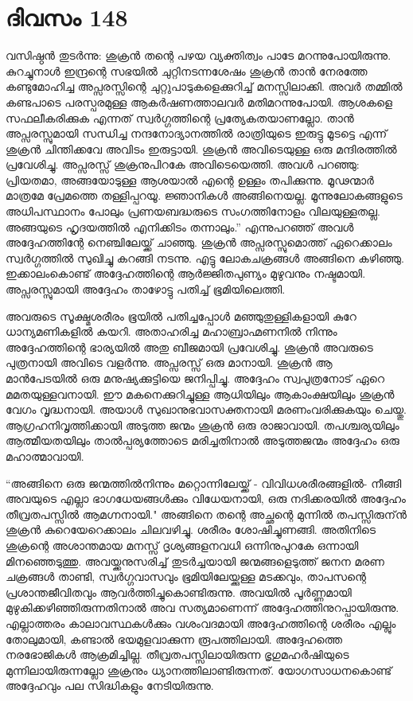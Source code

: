 \section{ദിവസം 148}


വസിഷ്ഠൻ തുടർന്നു: ശുക്രൻ തന്റെ പഴയ വ്യക്തിത്വം പാടേ മറന്നുപോയിരുന്നു. കുറച്ചുനാൾ ഇന്ദ്രന്റെ സഭയിൽ ചുറ്റിനടന്നശേഷം ശുക്രൻ താൻ നേരത്തേ കണ്ടുമോഹിച്ച അപ്സരസ്സിന്റെ ചുറ്റുപാടുകളെക്കുറിച്ച് മനസ്സിലാക്കി. അവർ തമ്മിൽ കണ്ടപാടെ പരസ്പരമുള്ള ആകർഷണത്താലവർ മതിമറന്നുപോയി. ആശകളെ സഫലീകരിക്കുക എന്നത് സ്വർഗ്ഗത്തിന്റെ പ്രത്യേകതയാണല്ലോ. താൻ അപ്സരസ്സുമായി സന്ധിച്ച നന്ദനോദ്യാനത്തില്‍  രാത്രിയുടെ ഇരുട്ടു മൂടട്ടെ  എന്ന് ശുക്രൻ ചിന്തിക്കവേ അവിടം ഇരുട്ടായി. ശുക്രൻ അവിടെയുള്ള ഒരു മന്ദിരത്തിൽ പ്രവേശിച്ചു. അപ്സരസ്സ് ശുക്രനുപിറകേ അവിടെയെത്തി. അവൾ പറഞ്ഞു: പ്രിയതമാ, അങ്ങയോടുള്ള ആശയാൽ എന്റെ ഉള്ളം തപിക്കുന്നു. മൂഢന്മാർ മാത്രമേ പ്രേമത്തെ തള്ളിപ്പറയൂ. ജ്ഞാനികൾ അങ്ങിനെയല്ല. മൂന്നുലോകങ്ങളുടെ അധിപസ്ഥാനം പോലും പ്രണയബദ്ധരുടെ സംഗത്തിനോളം വിലയുള്ളതല്ല. അങ്ങയുടെ ഹൃദയത്തിൽ എനിക്കിടം തന്നാലും.” എന്നുപറഞ്ഞ് അവൾ അദ്ദേഹത്തിന്റേ നെഞ്ചിലേയ്ക്ക് ചാഞ്ഞു. ശുക്രൻ അപ്സരസ്സുമൊത്ത് ഏറെക്കാലം സ്വർഗ്ഗത്തിൽ സുഖിച്ചു കറങ്ങി നടന്നു. എട്ടു ലോകചക്രങ്ങൾ അങ്ങിനെ കഴിഞ്ഞു. ഇക്കാലംകൊണ്ട് അദ്ദേഹത്തിന്റെ ആർജ്ജിതപുണ്യം മുഴുവനും നഷ്ടമായി. അപ്സരസ്സുമായി അദ്ദേഹം താഴോട്ടു പതിച്ച് ഭൂമിയിലെത്തി.

അവരുടെ സൂക്ഷ്മശരീരം ഭൂയിൽ പതിച്ചപ്പോൾ മഞ്ഞുതുള്ളികളായി കുറേ ധാന്യമണികളിൽ കയറി. അതാഹരിച്ച മഹാബ്രാഹ്മണനിൽ നിന്നും അദ്ദേഹത്തിന്റെ ഭാര്യയിൽ അതു ബീജമായി പ്രവേശിച്ചു. ശുക്രൻ അവരുടെ പുത്രനായി അവിടെ വളർന്നു. അപ്സരസ്സ് ഒരു മാനായി. ശുക്രൻ ആ മാൻപേടയിൽ ഒരു മനുഷ്യക്കുട്ടിയെ ജനിപ്പിച്ചു. അദ്ദേഹം സ്വപുത്രനോട് ഏറെ മമതയുള്ളവനായി. ഈ മകനെക്കുറിച്ചുള്ള ആധിയിലും ആകാംക്ഷയിലും ശുക്രൻ വേഗം വൃദ്ധനായി. അയാൾ സുഖാനുഭവാസക്തനായി മരണംവരിക്കുകയും ചെയ്തു. ആഗ്രഹനിവൃത്തിക്കായി അടുത്ത ജന്മം ശുക്രൻ ഒരു രാജാവായി. തപശ്ചര്യയിലും ആത്മീയതയിലും താല്‍പ്പര്യത്തോടെ മരിച്ചതിനാൽ അടുത്തജന്മം അദ്ദേഹം ഒരു മഹാത്മാവായി.

“അങ്ങിനെ ഒരു ജന്മത്തിൽനിന്നും മറ്റൊന്നിലേയ്ക്ക് - വിവിധശരീരങ്ങളിൽ- നീങ്ങി അവയുടെ എല്ലാ ഭാഗധേയങ്ങൾക്കും വിധേയനായി, ഒരു നദിക്കരയിൽ അദ്ദേഹം തീവ്രതപസ്സിൽ ആമഗ്നനായി." അങ്ങിനെ തന്റെ അച്ഛന്റെ മുന്നില്‍  തപസ്സിരുന്ന്‍ ശുക്രൻ കുറെയേറെക്കാലം ചിലവഴിച്ചു. ശരീരം ശോഷിച്ചുണങ്ങി. അതിനിടെ ശുക്രന്റെ അശാന്തമായ മനസ്സ് ദൃശ്യങ്ങളനവധി ഒന്നിനുപുറകേ ഒന്നായി മിനഞ്ഞെടുത്തു. അവയ്ക്കനുസരിച്ച് തുടർച്ചയായി ജന്മങ്ങളെടുത്ത് ജനന മരണ ചക്രങ്ങൾ താണ്ടി, സ്വർഗ്ഗവാസവും ഭൂമിയിലേയ്ക്കുള്ള മടക്കവും, താപസന്റെ പ്രശാന്തജീവിതവും ആവർത്തിച്ചുകൊണ്ടിരുന്നു. അവയിൽ പൂർണ്ണമായി മുഴുകിക്കഴിഞ്ഞിരുന്നതിനാൽ അവ സത്യമാണെന്ന് അദ്ദേഹത്തിനുറപ്പായിരുന്നു. എല്ലാത്തരം കാലാവസ്ഥകൾക്കും വശംവദമായി അദ്ദേഹത്തിന്റെ ശരീരം എല്ലും തോലുമായി, കണ്ടാൽ ഭയമുളവാക്കുന്ന രൂപത്തിലായി. അദ്ദേഹത്തെ നരഭോജികൾ ആക്രമിച്ചില്ല. തീവ്രതപസ്സിലായിരുന്ന ഭൃഗുമഹർഷിയുടെ മുന്നിലായിരുന്നല്ലോ ശുക്രനും ധ്യാനത്തിലാണ്ടിരുന്നത്. യോഗസാധനകൊണ്ട് അദ്ദേഹവും പല സിദ്ധികളും നേടിയിരുന്നു. 


